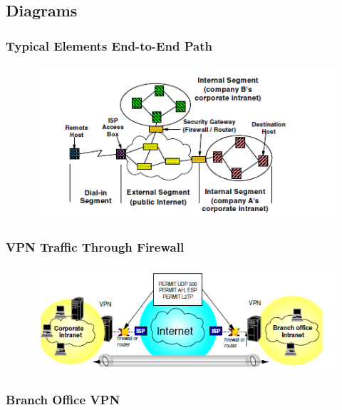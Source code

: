 \documentclass[10pt,a4paper]{article}
\begin{document}
\begin{itemize}
\begin{itemize}
\begin{itemize}
\part{Diagrams}
\section{Typical Elements End-to-End Path}

\begin{figure}[hbtp]
\centering
\includegraphics[scale=1]{TypicalElementsEnd-To-End-Path.png}
\end{figure}

\newpage
\section{VPN Traffic Through Firewall}

\begin{figure}[hbtp]
\centering
\includegraphics[scale=1]{VPN-Traffic-Through-FireWall.png}
\end{figure}


\newpage
\section{Branch Office VPN}


\end{itemize}
\end{itemize}
\end{itemize}
\end{document}
